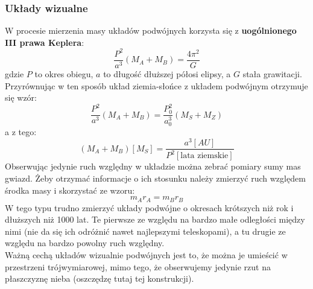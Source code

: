 \documentclass[../index.tex]{subfiles}
\begin{document}
            \subsubsection{Układy wizualne} 
                W procesie mierzenia masy układów podwójnych korzysta się z \textbf{uogólnionego III prawa Keplera}:
                \begin{equation}
                    \frac{P^2}{a^3 }(M_A + M_B) = \frac{4\pi^2}{G}
                \end{equation}
                gdzie \(P\) to okres obiegu, \(a\) to długość dłuższej półosi elipsy, a \(G\) stała grawitacji. Przyrównując w ten sposób układ ziemia-słońce z układem podwójnym otrzymuje się wzór:
                \begin{equation}
                    \frac{P^2}{a^3 }(M_A + M_B) = \frac{P_0^2}{a_0^3 }(M_S + M_Z) 
                \end{equation}
                a z tego:
                \begin{equation}
                    (M_A + M_B)[M_S] = \frac{a^3[AU]}{P^2[\text{lata ziemskie}]}  
                \end{equation}
                Obserwując jedynie ruch względny w układzie można zebrać pomiary sumy mas gwiazd. Żeby otrzymać informacje o ich stosunku należy zmierzyć ruch względem środka masy i skorzystać ze wzoru:
                \begin{equation}
                    m_A r_A = m_B r_B
                \end{equation}
                W tego typu trudno zmierzyć układy podwójne o okresach krótszych niż rok i dłuższych niż 1000 lat. Te pierwsze ze względu na bardzo małe odległości między nimi (nie da się ich odróżnić nawet najlepszymi teleskopami), a tu drugie ze względu na bardzo powolny ruch względny.\\
                Ważną cechą układów wizualnie podwójnych jest to, że można je umieścić w przestrzeni trójwymiarowej, mimo tego, że obserwujemy jedynie rzut na płaszczyznę nieba (oszczędzę tutaj tej konstrukcji).
\end{document}
